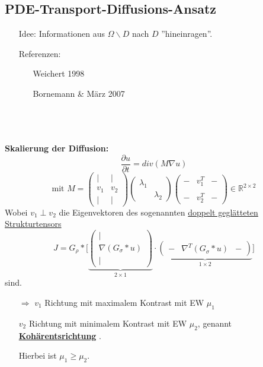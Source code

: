 \documentclass{article}
\theoremstyle{plain}
\theoremstyle{definition}
\numberwithin{equation}{section}
\newcommand{\R}[0] {
\mathbb R
}
\newcommand{\srmatrix}[1] {
\left( \begin{smallmatrix} #1 \end{smallmatrix} \right)
}
\newcommand{\mim}[1] {
\underline{\textbf{#1\index{#1}}}
}
\newcommand{\mat}[1] {
\begin{pmatrix} #1 \end{pmatrix}
}
\begin{document}
  \subsection{PDE-Transport-Diffusions-Ansatz}
    \begin{minipage}[c]{0.25\linewidth}
      \begin{center}
      \end{center}
    \end{minipage}
    \hfill
    \begin{minipage}[c]{0.65\linewidth}
        \begin{enumerate}
          \item[Idee:] Informationen aus $\Omega \backslash D$ nach $D$ ''hineinragen''.
          \item[Referenzen:] \begin{enumerate}
            \item[\textbullet] Weichert 1998
            \item[\textbullet] Bornemann \& März 2007
          \end{enumerate}
        \end{enumerate}
    \end{minipage}
    \ \\
    \ \\
    \hfill\\
    \textbf{Skalierung der Diffusion:}
    \[\frac{\partial u}{\partial t} = div(M \nabla u)\]
    \[\text{mit } M = \srmatrix{ | & |\\ v_1 & v_2\\ | & |} \mat{\lambda_1 & \ \\ & \lambda_2} \srmatrix{- & v_1^T & -\\ \\- & v_2^T & -} \in \R^{2 \times 2}\]
    Wobei $v_1 \perp v_2$ die Eigenvektoren des sogenannten \underline{doppelt geglätteten Strukturtensors} 
    \[J= G_\rho * \biggl[ \underbrace{\srmatrix{| \\ \nabla (G_\sigma * u)\\ |}}_{2 \times 1} \cdot \underbrace{\srmatrix{- & \nabla^T(G_\sigma * u) & -}}_{1 \times 2} \biggr] \]
    sind.\\
    \begin{enumerate}
      \item[$\Rightarrow$] $v_1$ Richtung mit maximalem Kontrast mit EW $\mu_1$
      \item[] $v_2$ Richtung mit minimalem Kontrast mit EW $\mu_2$, genannt \mim{Kohärentsrichtung}.
      \item[] Hierbei ist $\mu_1 \geq \mu_2$.
    \end{enumerate}
\end{document}
